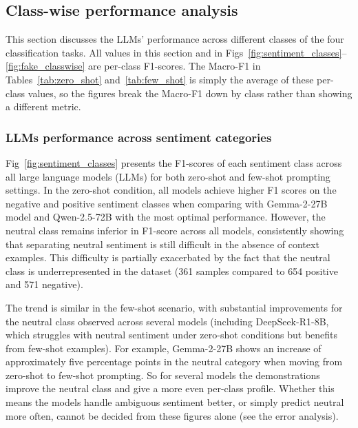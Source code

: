 \documentclass[10pt,letterpaper]{article}
\begin{document}
\subsection*{Class-wise performance analysis}

This section discusses the LLMs' performance across different classes of the four classification tasks. All values in this section and in Figs~\ref{fig:sentiment_classes}--\ref{fig:fake_classwise} are per-class F1-scores. The Macro-F1 in Tables~\ref{tab:zero_shot} and~\ref{tab:few_shot} is simply the average of these per-class values, so the figures break the Macro-F1 down by class rather than showing a different metric.

\subsubsection*{LLMs performance across sentiment categories}
\label{sec:sentiment_classes}

Fig~\ref{fig:sentiment_classes} presents the F1-scores of each sentiment class across all large language models (LLMs) for both zero-shot and few-shot prompting settings. In the zero-shot condition, all models achieve higher F1 scores on the negative and positive sentiment classes when comparing with Gemma-2-27B model and Qwen-2.5-72B with the most optimal performance. However, the neutral class remains inferior in F1-score across all models, consistently showing that separating neutral sentiment is still difficult in the absence of context examples. This difficulty is partially exacerbated by the fact that the neutral class is underrepresented in the dataset (361 samples compared to 654 positive and 571 negative).

The trend is similar in the few-shot scenario, with substantial improvements for the neutral class observed across several models (including DeepSeek-R1-8B, which struggles with neutral sentiment under zero-shot conditions but benefits from few-shot examples). For example, Gemma-2-27B shows an increase of approximately five percentage points in the neutral category when moving from zero-shot to few-shot prompting. So for several models the demonstrations improve the neutral class and give a more even per-class profile. Whether this means the models handle ambiguous sentiment better, or simply predict neutral more often, cannot be decided from these figures alone (see the error analysis).
\end{document}

